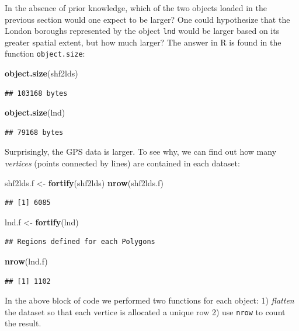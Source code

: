 \documentclass[]{article}
\newenvironment{Shaded}{}{}
\newcommand{\KeywordTok}[1]{\textcolor[rgb]{0.00,0.44,0.13}{\textbf{{#1}}}}
\newcommand{\NormalTok}[1]{{#1}}
\begin{document}
In the absence of prior knowledge, which of the two objects loaded in
the previous section would one expect to be larger? One could
hypothesize that the London boroughs represented by the object
\texttt{lnd} would be larger based on its greater spatial extent, but
how much larger? The answer in R is found in the function
\texttt{object.size}:

\begin{Shaded}
\begin{Highlighting}[]
\KeywordTok{object.size}\NormalTok{(shf2lds)}
\end{Highlighting}
\end{Shaded}
\begin{verbatim}
## 103168 bytes
\end{verbatim}
\begin{Shaded}
\begin{Highlighting}[]
\KeywordTok{object.size}\NormalTok{(lnd)}
\end{Highlighting}
\end{Shaded}
\begin{verbatim}
## 79168 bytes
\end{verbatim}
Surprisingly, the GPS data is larger. To see why, we can find out how
many \emph{vertices} (points connected by lines) are contained in each
dataset:

\begin{Shaded}
\begin{Highlighting}[]
\NormalTok{shf2lds.f <- }\KeywordTok{fortify}\NormalTok{(shf2lds)}
\KeywordTok{nrow}\NormalTok{(shf2lds.f)}
\end{Highlighting}
\end{Shaded}
\begin{verbatim}
## [1] 6085
\end{verbatim}
\begin{Shaded}
\begin{Highlighting}[]

\NormalTok{lnd.f <- }\KeywordTok{fortify}\NormalTok{(lnd)}
\end{Highlighting}
\end{Shaded}
\begin{verbatim}
## Regions defined for each Polygons
\end{verbatim}
\begin{Shaded}
\begin{Highlighting}[]
\KeywordTok{nrow}\NormalTok{(lnd.f)}
\end{Highlighting}
\end{Shaded}
\begin{verbatim}
## [1] 1102
\end{verbatim}
In the above block of code we performed two functions for each object:
1) \emph{flatten} the dataset so that each vertice is allocated a unique
row 2) use \texttt{nrow} to count the result.
\end{document}
